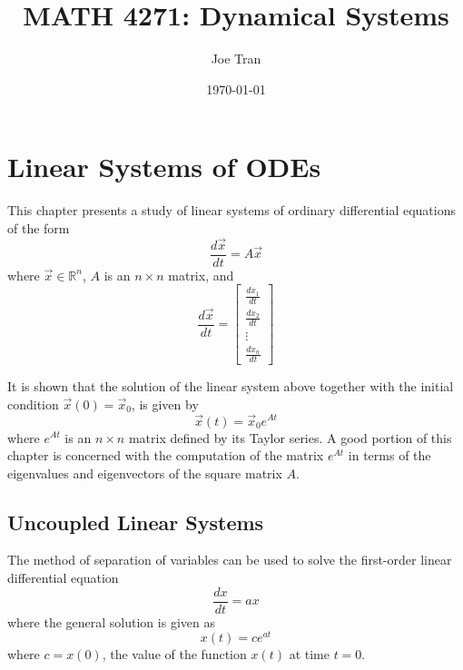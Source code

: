 \documentclass[11pt]{book}
\title{\textbf{MATH 4271: Dynamical Systems}}
\author{Joe Tran}
\date{\today}
\theoremstyle{definition}\newtheorem{definition}[subsection]{Definition}
\theoremstyle{definition}\newtheorem{example}[subsection]{Example}
\theoremstyle{definition}\newtheorem{notation}[subsection]{Notation}
\theoremstyle{definition}\newtheorem{remark}[subsection]{Remark}
\theoremstyle{theorem}\newtheorem{theorem}[subsection]{Theorem}
\theoremstyle{theorem}\newtheorem{lemma}[subsection]{Lemma}
\theoremstyle{theorem}\newtheorem{proposition}[subsection]{Proposition}
\theoremstyle{theorem}\newtheorem{corollary}[subsection]{Corollary}
\theoremstyle{theorem}\newtheorem{case}{Case}
\theoremstyle{remark}\newtheorem{subcase}{Subcase}[case]
\newcommand{\R}{\mathbb{R}}
\begin{document}
\maketitle

\tableofcontents

\chapter{Linear Systems of ODEs}

This chapter presents a study of linear systems of ordinary differential equations of the form
\begin{equation*}
    \frac{d\vec{x}}{dt} = A\vec{x}
\end{equation*}
where $\vec{x} \in \R^n$, $A$ is an $n \times n$ matrix, and
\begin{equation*}
    \frac{d\vec{x}}{dt} = \begin{bmatrix} \frac{dx_1}{dt} \\ \frac{dx_2}{dt} \\ \vdots \\ \frac{dx_n}{dt} \end{bmatrix}
\end{equation*}

It is shown that the solution of the linear system above together with the initial condition $\vec{x}(0) = \vec{x}_0$, is given by
\begin{equation*}
    \vec{x}(t) = \vec{x}_0 e^{At}
\end{equation*}
where $e^{At}$ is an $n \times n$ matrix defined by its Taylor series. A good portion of this chapter is concerned with the computation of the matrix $e^{At}$ in terms of the eigenvalues and eigenvectors of the square matrix $A$.

\section{Uncoupled Linear Systems}

The method of separation of variables can be used to solve the first-order linear differential equation
\begin{equation*}
    \frac{dx}{dt} = ax
\end{equation*}
where the general solution is given as
\begin{equation*}
    x(t) = ce^{at}
\end{equation*}
where $c = x(0)$, the value of the function $x(t)$ at time $t = 0$.
\end{document}
